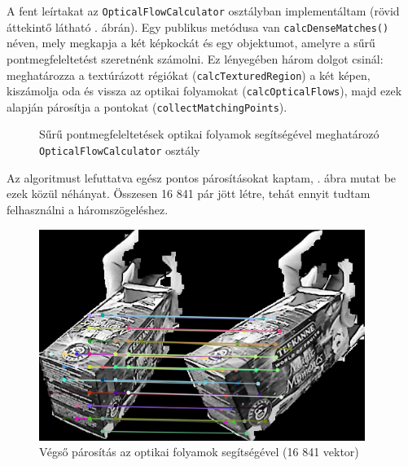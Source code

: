 A fent leírtakat az \texttt{OpticalFlowCalculator} osztályban implementáltam (rövid áttekintő látható . ábrán). Egy publikus metódusa van \texttt{calcDenseMatches()} néven, mely megkapja a két képkockát és egy objektumot, amelyre a sűrű pontmegfeleltetést szeretnénk számolni. Ez lényegében három dolgot csinál: meghatározza a textúrázott régiókat (\texttt{calcTexturedRegion}) a két képen, kiszámolja oda és vissza az optikai folyamokat (\texttt{calcOpticalFlows}), majd ezek alapján párosítja a pontokat (\texttt{collectMatchingPoints}).

\begin{figure}[tbh]
\centering


\caption{Sűrű pontmegfeleltetések optikai folyamok segítségével meghatározó \texttt{OpticalFlowCalculator} osztály \label{fig:cd:ofcalc}}
\end{figure}

Az algoritmust lefuttatva egész pontos párosításokat kaptam, . ábra mutat be ezek közül néhányat. Összesen 16 841 pár jött létre, tehát ennyit tudtam felhasználni a háromszögeléshez. %

\begin{figure}[tbh]
\centering
\includegraphics[width=300pt]{figures/vis_full.png}
\caption{Végső párosítás az optikai folyamok segítségével (16 841 vektor) \label{fig:vis_full}}
\end{figure}

